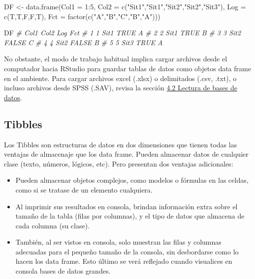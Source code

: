 \documentclass[
]{article}
\newenvironment{Shaded}{\begin{snugshade}}{\end{snugshade}}
\newcommand{\AttributeTok}[1]{\textcolor[rgb]{0.77,0.63,0.00}{#1}}
\newcommand{\CommentTok}[1]{\textcolor[rgb]{0.56,0.35,0.01}{\textit{#1}}}
\newcommand{\DecValTok}[1]{\textcolor[rgb]{0.00,0.00,0.81}{#1}}
\newcommand{\FunctionTok}[1]{\textcolor[rgb]{0.00,0.00,0.00}{#1}}
\newcommand{\NormalTok}[1]{#1}
\newcommand{\OtherTok}[1]{\textcolor[rgb]{0.56,0.35,0.01}{#1}}
\newcommand{\SpecialCharTok}[1]{\textcolor[rgb]{0.00,0.00,0.00}{#1}}
\newcommand{\StringTok}[1]{\textcolor[rgb]{0.31,0.60,0.02}{#1}}
\providecommand{\tightlist}{%
  \setlength{\itemsep}{0pt}\setlength{\parskip}{0pt}}
\theoremstyle{definition}
\theoremstyle{definition}
\theoremstyle{definition}
\theoremstyle{definition}
\theoremstyle{remark}
\begin{document}
\begin{Shaded}
\begin{Highlighting}[]
\NormalTok{DF }\OtherTok{\textless{}{-}} \FunctionTok{data.frame}\NormalTok{(}\AttributeTok{Col1 =} \DecValTok{1}\SpecialCharTok{:}\DecValTok{5}\NormalTok{, }
                 \AttributeTok{Col2 =} \FunctionTok{c}\NormalTok{(}\StringTok{"Sit1"}\NormalTok{,}\StringTok{"Sit1"}\NormalTok{,}\StringTok{"Sit2"}\NormalTok{,}\StringTok{"Sit2"}\NormalTok{,}\StringTok{"Sit3"}\NormalTok{),}
                 \AttributeTok{Log =} \FunctionTok{c}\NormalTok{(T,T,F,F,T),}
                 \AttributeTok{Fct =} \FunctionTok{factor}\NormalTok{(}\FunctionTok{c}\NormalTok{(}\StringTok{"A"}\NormalTok{,}\StringTok{"B"}\NormalTok{,}\StringTok{"C"}\NormalTok{,}\StringTok{"B"}\NormalTok{,}\StringTok{"A"}\NormalTok{)))}

\NormalTok{DF}
\CommentTok{\#   Col1 Col2   Log Fct}
\CommentTok{\# 1    1 Sit1  TRUE   A}
\CommentTok{\# 2    2 Sit1  TRUE   B}
\CommentTok{\# 3    3 Sit2 FALSE   C}
\CommentTok{\# 4    4 Sit2 FALSE   B}
\CommentTok{\# 5    5 Sit3  TRUE   A}
\end{Highlighting}
\end{Shaded}

No obstante, el modo de trabajo habitual implica cargar archivos desde el computador hacia RStudio para guardar tablas de datos como objetos data frame en el ambiente. Para cargar archivos excel (.xlsx) o delimitados (.csv, .txt), o incluso archivos desde SPSS (.SAV), revisa la sección \protect\hyperlink{lectura-de-bases-de-datos}{4.2 Lectura de bases de datos}.

\hypertarget{tibbles}{%
\subsection{Tibbles}\label{tibbles}}

Los Tibbles son estructuras de datos en dos dimensiones que tienen todas las ventajas de almacenaje que los data frame. Pueden almacenar datos de cualquier clase (texto, números, lógicos, etc). Pero presentan dos ventajas adicionales:

\begin{itemize}
\tightlist
\item
  Pueden almacenar objetos complejos, como modelos o fórmulas en las celdas, como si se tratase de un elemento cualquiera.
\item
  Al imprimir sus resultados en consola, brindan información extra sobre el tamaño de la tabla (filas por columnas), y el tipo de datos que almacena de cada columna (su clase).
\item
  También, al ser vistos en consola, solo muestran las filas y columnas adecuadas para el pequeño tamaño de la consola, sin desbordarse como lo hacen los data frame. Esto último se verá reflejado cuando visualices en consola bases de datos grandes.
\end{itemize}
\end{document}
